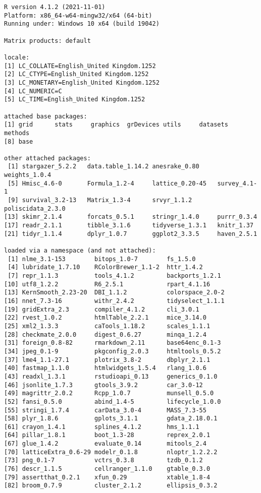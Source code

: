 \documentclass[
  letterpaper,
  DIV=11,
  numbers=noendperiod]{scrreprt}
\begin{document}
\begin{verbatim}
R version 4.1.2 (2021-11-01)
Platform: x86_64-w64-mingw32/x64 (64-bit)
Running under: Windows 10 x64 (build 19042)

Matrix products: default

locale:
[1] LC_COLLATE=English_United Kingdom.1252 
[2] LC_CTYPE=English_United Kingdom.1252   
[3] LC_MONETARY=English_United Kingdom.1252
[4] LC_NUMERIC=C                           
[5] LC_TIME=English_United Kingdom.1252    

attached base packages:
[1] grid      stats     graphics  grDevices utils     datasets  methods  
[8] base     

other attached packages:
 [1] stargazer_5.2.2   data.table_1.14.2 anesrake_0.80     weights_1.0.4    
 [5] Hmisc_4.6-0       Formula_1.2-4     lattice_0.20-45   survey_4.1-1     
 [9] survival_3.2-13   Matrix_1.3-4      srvyr_1.1.2       poliscidata_2.3.0
[13] skimr_2.1.4       forcats_0.5.1     stringr_1.4.0     purrr_0.3.4      
[17] readr_2.1.1       tibble_3.1.6      tidyverse_1.3.1   knitr_1.37       
[21] tidyr_1.1.4       dplyr_1.0.7       ggplot2_3.3.5     haven_2.5.1      

loaded via a namespace (and not attached):
 [1] nlme_3.1-153        bitops_1.0-7        fs_1.5.0           
 [4] lubridate_1.7.10    RColorBrewer_1.1-2  httr_1.4.2         
 [7] repr_1.1.3          tools_4.1.2         backports_1.2.1    
[10] utf8_1.2.2          R6_2.5.1            rpart_4.1.16       
[13] KernSmooth_2.23-20  DBI_1.1.2           colorspace_2.0-2   
[16] nnet_7.3-16         withr_2.4.2         tidyselect_1.1.1   
[19] gridExtra_2.3       compiler_4.1.2      cli_3.0.1          
[22] rvest_1.0.2         htmlTable_2.2.1     mice_3.14.0        
[25] xml2_1.3.3          caTools_1.18.2      scales_1.1.1       
[28] checkmate_2.0.0     digest_0.6.27       minqa_1.2.4        
[31] foreign_0.8-82      rmarkdown_2.11      base64enc_0.1-3    
[34] jpeg_0.1-9          pkgconfig_2.0.3     htmltools_0.5.2    
[37] lme4_1.1-27.1       plotrix_3.8-2       dbplyr_2.1.1       
[40] fastmap_1.1.0       htmlwidgets_1.5.4   rlang_1.0.6        
[43] readxl_1.3.1        rstudioapi_0.13     generics_0.1.0     
[46] jsonlite_1.7.3      gtools_3.9.2        car_3.0-12         
[49] magrittr_2.0.2      Rcpp_1.0.7          munsell_0.5.0      
[52] fansi_0.5.0         abind_1.4-5         lifecycle_1.0.0    
[55] stringi_1.7.4       carData_3.0-4       MASS_7.3-55        
[58] plyr_1.8.6          gplots_3.1.1        gdata_2.18.0.1     
[61] crayon_1.4.1        splines_4.1.2       hms_1.1.1          
[64] pillar_1.8.1        boot_1.3-28         reprex_2.0.1       
[67] glue_1.4.2          evaluate_0.14       mitools_2.4        
[70] latticeExtra_0.6-29 modelr_0.1.8        nloptr_1.2.2.2     
[73] png_0.1-7           vctrs_0.3.8         tzdb_0.1.2         
[76] descr_1.1.5         cellranger_1.1.0    gtable_0.3.0       
[79] assertthat_0.2.1    xfun_0.29           xtable_1.8-4       
[82] broom_0.7.9         cluster_2.1.2       ellipsis_0.3.2     
\end{verbatim}
\end{document}

